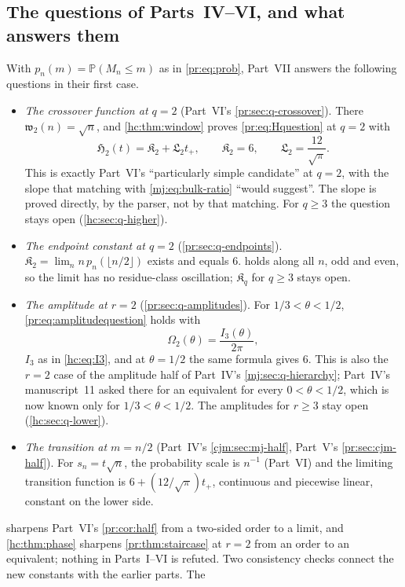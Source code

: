 \documentclass[11pt,a4paper]{article}
\theoremstyle{definition}\newaliascnt{definition}{theorem}
\theoremstyle{remark}\newaliascnt{remark}{theorem}
\newcommand{\ljP}{\mathbb P}
\begin{document}
\subsection{The questions of Parts~IV--VI, and what answers them}
\label{hc:sec:answer}
With $p_n(m)=\ljP(M_n\le m)$ as in \eqref{pr:eq:prob}, Part~VII answers the
following questions in their first case.
\begin{itemize}
\item \emph{The crossover function at $q=2$} (Part~VI's
 \cref{pr:sec:q-crossover}). There $\mathfrak w_2(n)=\sqrt n$, and
 \cref{hc:thm:window} proves \eqref{pr:eq:Hquestion} at $q=2$ with
 \[
  \mathfrak H_2(t)=\mathfrak K_2+\mathfrak L_2t_+,\qquad
  \mathfrak K_2=6,\qquad \mathfrak L_2=\frac{12}{\sqrt\pi}.
 \]
 This is exactly Part~VI's ``particularly simple candidate'' at $q=2$, with
 the slope that matching with \eqref{mj:eq:bulk-ratio} ``would suggest''.
 The slope is proved directly, by the parser, not by that matching. For
 $q\ge3$ the question stays open (\cref{hc:sec:q-higher}).
\item \emph{The endpoint constant at $q=2$} (\cref{pr:sec:q-endpoints}).
 $\mathfrak K_2=\lim_n n\,p_n(\lfloor n/2\rfloor)$ exists and equals $6$.
  holds along all $n$, odd and even, so the limit has no
 residue-class oscillation; $\mathfrak K_q$ for $q\ge3$ stays open.
\item \emph{The amplitude at $r=2$} (\cref{pr:sec:q-amplitudes}).
 For $1/3<\theta<1/2$, \eqref{pr:eq:amplitudequestion} holds with
 \[
  \Omega_2(\theta)=\frac{I_3(\theta)}{2\pi},
 \]
 $I_3$ as in \eqref{hc:eq:I3}, and at $\theta=1/2$ the same formula gives
 $6$. This is also the $r=2$ case of the amplitude half of Part~IV's
 \cref{mj:sec:q-hierarchy}; Part~IV's manuscript~11 asked there for an
 equivalent for every $0<\theta<1/2$, which is now known only for
 $1/3<\theta<1/2$. The amplitudes for $r\ge3$ stay open
 (\cref{hc:sec:q-lower}).
\item \emph{The transition at $m=n/2$} (Part~IV's \cref{cjm:sec:mj-half},
 Part~V's \cref{pr:sec:cjm-half}). For $s_n=t\sqrt n$, the probability scale
 is $n^{-1}$ (Part~VI) and the limiting transition function is
 $6+(12/\sqrt\pi)t_+$, continuous and piecewise linear, constant on the
 lower side.
\end{itemize}
 sharpens Part~VI's \cref{pr:cor:half} from a two-sided
order to a limit, and \cref{hc:thm:phase} sharpens \cref{pr:thm:staircase}
at $r=2$ from an order to an equivalent; nothing in Parts~I--VI is refuted.
Two consistency checks connect the new constants with the earlier parts. The
\end{document}
